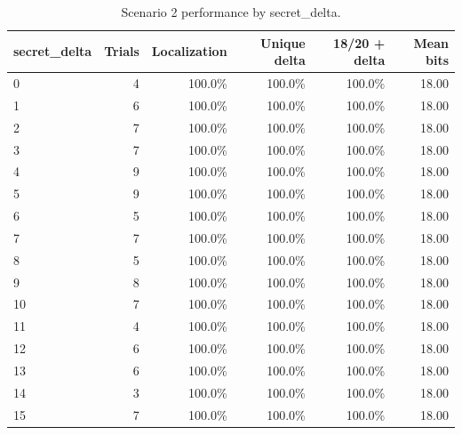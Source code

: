 \begin{table}[t]
\centering
\caption{Scenario 2 performance by secret\_delta.}
\label{tab:s2-per_delta}
\begin{tabular}{lrrrrr}
\toprule
secret\_delta & Trials & Localization & Unique delta & 18/20 + delta & Mean bits \\
\midrule
0 & 4 & 100.0\% & 100.0\% & 100.0\% & 18.00 \\
1 & 6 & 100.0\% & 100.0\% & 100.0\% & 18.00 \\
2 & 7 & 100.0\% & 100.0\% & 100.0\% & 18.00 \\
3 & 7 & 100.0\% & 100.0\% & 100.0\% & 18.00 \\
4 & 9 & 100.0\% & 100.0\% & 100.0\% & 18.00 \\
5 & 9 & 100.0\% & 100.0\% & 100.0\% & 18.00 \\
6 & 5 & 100.0\% & 100.0\% & 100.0\% & 18.00 \\
7 & 7 & 100.0\% & 100.0\% & 100.0\% & 18.00 \\
8 & 5 & 100.0\% & 100.0\% & 100.0\% & 18.00 \\
9 & 8 & 100.0\% & 100.0\% & 100.0\% & 18.00 \\
10 & 7 & 100.0\% & 100.0\% & 100.0\% & 18.00 \\
11 & 4 & 100.0\% & 100.0\% & 100.0\% & 18.00 \\
12 & 6 & 100.0\% & 100.0\% & 100.0\% & 18.00 \\
13 & 6 & 100.0\% & 100.0\% & 100.0\% & 18.00 \\
14 & 3 & 100.0\% & 100.0\% & 100.0\% & 18.00 \\
15 & 7 & 100.0\% & 100.0\% & 100.0\% & 18.00 \\
\bottomrule
\end{tabular}
\end{table}

